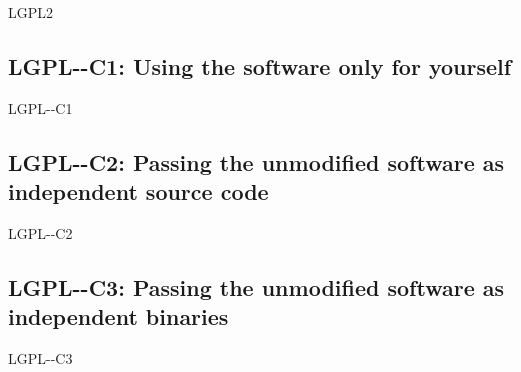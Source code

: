 \begin{license}{LGPL2} %

\subsection{LGPL-\ver-C1: Using the software only for yourself}
\begin{lsuc}{LGPL-\ver-C1}
  
  \useCaseOne

  \begin{lsucrequiresnothing}
  \end{lsucrequiresnothing}

  \lsucprohibitsnothing
\end{lsuc}

\subsection{LGPL-\ver-C2: Passing the unmodified software as independent source code}
\begin{lsuc}{LGPL-\ver-C2}

  \useCaseTwo

  \begin{lsucrequires}
    \lsucmandatory{\keepLicensingElements}
    \lsucmandatory{\lgpltwoEnsureCopyrightNoticeSource}
    \lsucmandatory{\giveLicense}\passingFilesCorrectly
    \lsucmandatory{\retainCopyrightNotices}
    \lsucoptional{\addToDocumentation}
  \end{lsucrequires}

  \lsucprohibitsnothing
\end{lsuc}

\subsection{LGPL-\ver-C3: Passing the unmodified software as independent binaries}
\begin{lsuc}{LGPL-\ver-C3} 


\end{lsuc}
\end{license}
